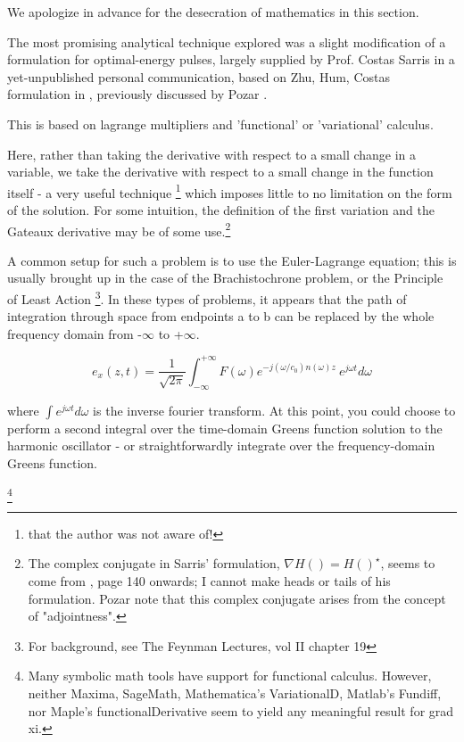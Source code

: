 \documentclass[paper.tex]{subfiles}
\begin{document}
We apologize in advance for the desecration of mathematics in this section.

The most promising analytical technique explored was a slight modification of a formulation for optimal-energy pulses, largely supplied by Prof. Costas Sarris in a yet-unpublished personal communication, based on Zhu, Hum, Costas formulation in \cite{Microwave2012b}, previously discussed by Pozar \cite{Waveform2003}. 

This is based on lagrange multipliers and 'functional' or 'variational' calculus\cite{Methods1989}. 

Here, rather than taking the derivative with respect to a small change in a variable, we take the derivative with respect to a small change in the function itself - a very useful technique \footnote{that the author was not aware of!} which imposes little to no limitation on the form of the solution. For some intuition, the definition of the first variation and the Gateaux derivative may be of some use.\footnote{The complex conjugate in Sarris' formulation, $\nabla H() = H()^\star$, seems to come from \cite{Signal1969}, page 140 onwards; I cannot make heads or tails of his formulation. Pozar note that this complex conjugate arises from the concept of "adjointness".}

A common setup for such a problem is to use the Euler-Lagrange equation; this is usually brought up in the case of the Brachistochrone problem, or the Principle of Least Action \footnote{For background, see The Feynman Lectures, vol II chapter 19}. In these types of problems, it appears that the path of integration through space from endpoints a to b can be replaced by the whole frequency domain from -$\infty$ to +$\infty$. 

$$ e_x(z,t) = \frac{1}{\sqrt{2 \pi}} \int_{-\infty}^{+\infty}{F(\omega) e^{- j (\omega/c_0)n(\omega)z}\ e^{j\omega t} d\omega} $$

where $\int e^{j \omega t} d\omega$ is the inverse fourier transform. At this point, you could choose to perform a second integral over the time-domain Greens function solution to the harmonic oscillator\cite{Complex2020} - or straightforwardly integrate over the frequency-domain Greens function.

\footnote{Many symbolic math tools have support for functional calculus. However, neither Maxima, SageMath, Mathematica's VariationalD, Matlab's Fundiff, nor Maple's functionalDerivative seem to yield any meaningful result for grad xi.}\\
\end{document}
